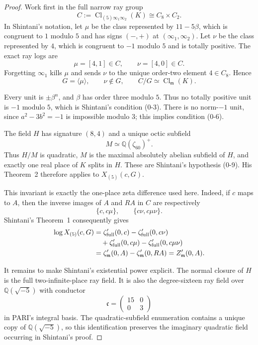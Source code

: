 \documentclass[11pt]{article}
\newcommand{\Cl}{\operatorname{Cl}}
\newcommand{\Q}{\mathbb Q}
\begin{document}
\begin{proof}
Work first in the full narrow ray group
\[
 C:=\Cl_{(5)\infty_1\infty_2}(K)\cong C_8\times C_2.
\]
In Shintani's notation, let $\mu$ be the class represented by
$11-5\beta$, which is congruent to $1$ modulo $5$ and has signs
$(-,+)$ at $(\infty_1,\infty_2)$.  Let $\nu$ be the class represented
by $4$, which is congruent to $-1$ modulo $5$ and is totally positive.
The exact ray logs are
\[
 \mu=[4,1]\in C,\qquad \nu=[4,0]\in C.
\]
Forgetting $\infty_1$ kills $\mu$ and sends $\nu$ to the unique
order-two element $4\in C_8$.  Hence
\[
 G=\langle\mu\rangle,\qquad \nu\notin G,\qquad
 C/G\simeq\Cl_{\mathfrak m}(K).
\]

Every unit is $\pm\beta^n$, and $\beta$ has order three modulo $5$.
Thus no totally positive unit is $-1$ modulo $5$, which is Shintani's
condition (0-3).  There is no norm-$-1$ unit, since
$a^2-3b^2=-1$ is impossible modulo $3$; this implies condition (0-6).

The field $H$ has signature $(8,4)$ and a unique octic subfield
\[
 M\simeq\Q(\zeta_{60})^+.
\]
Thus $H/M$ is quadratic, $M$ is the maximal absolutely abelian
subfield of $H$, and exactly one real place of $K$ splits in $H$.
These are Shintani's hypothesis (0-9).  His Theorem~2
\cite{Shintani1978} therefore applies to $X_{(5)}(c,G)$.

This invariant is exactly the one-place zeta difference used here.
Indeed, if $c$ maps to $A$, then the inverse images of $A$ and
$RA$ in $C$ are respectively
\[
 \{c,c\mu\},\qquad \{c\nu,c\mu\nu\}.
\]
Shintani's Theorem~1 consequently gives
\[
\begin{aligned}
\log X_{(5)}(c,G)
&=\zeta'_{\rm full}(0,c)-\zeta'_{\rm full}(0,c\nu)\\
&\quad+\zeta'_{\rm full}(0,c\mu)
       -\zeta'_{\rm full}(0,c\mu\nu)\\
&=\zeta'_{\mathfrak m}(0,A)-\zeta'_{\mathfrak m}(0,RA)
=Z'_{\mathfrak m}(0,A).
\end{aligned}
\]

It remains to make Shintani's existential power explicit.  The normal
closure of $H$ is the full two-infinite-place ray field.  It is also
the degree-sixteen ray field over $\Q(\sqrt{-5})$ with conductor
\[
 \mathfrak c=\begin{pmatrix}15&0\\0&3\end{pmatrix}
\]
in PARI's integral basis.  The quadratic-subfield enumeration contains
a unique copy of $\Q(\sqrt{-5})$, so this identification preserves the
imaginary quadratic field occurring in Shintani's proof.


\end{proof}
\end{document}
